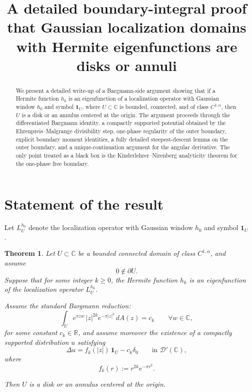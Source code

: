 \documentclass[11pt]{amsart}
\title[Gaussian localization domains for Hermite eigenfunctions]{A detailed boundary-integral proof that Gaussian localization domains with Hermite eigenfunctions are disks or annuli}
\author{}
\date{}
\newtheorem{theorem}{Theorem}
\theoremstyle{remark}
\newcommand{\C}{\mathbb C}
\newcommand{\R}{\mathbb R}
\newcommand{\D}{\mathcal D}
\newcommand{\1}{\mathbf 1}
\begin{document}
\maketitle

\begin{abstract}
We present a detailed write-up of a Bargmann-side argument showing that if a Hermite function $h_k$ is an eigenfunction of a localization operator with Gaussian window $h_0$ and symbol $\mathbf 1_U$, where $U\subset\C$ is bounded, connected, and of class $C^{1,\alpha}$, then $U$ is a disk or an annulus centered at the origin. The argument proceeds through the differentiated Bargmann identity, a compactly supported potential obtained by the Ehrenpreis--Malgrange divisibility step, one-phase regularity of the outer boundary, explicit boundary moment identities, a fully detailed steepest-descent lemma on the outer boundary, and a unique-continuation argument for the angular derivative. The only point treated as a black box is the Kinderlehrer--Nirenberg analyticity theorem for the one-phase free boundary.
\end{abstract}

\section{Statement of the result}

Let $L_U^{h_0}$ denote the localization operator with Gaussian window $h_0$ and symbol $\mathbf 1_U$.

\begin{theorem}\label{thm:main}
Let $U\subset\C$ be a bounded connected domain of class $C^{1,\alpha}$, and assume
\[
0\notin \partial U.
\]
Suppose that for some integer $k\ge 0$, the Hermite function $h_k$ is an eigenfunction of the localization operator $L_U^{h_0}$.

Assume the standard Bargmann reduction:
\begin{equation}\label{eq:exp-identity}
\int_U e^{\pi z w}\, |z|^{2k} e^{-\pi |z|^2}\, dA(z)=c_k
\qquad \forall w\in\C,
\end{equation}
for some constant $c_k\in\R$, and assume moreover the existence of a compactly supported distribution $u$ satisfying
\begin{equation}\label{eq:distribution-u}
\Delta u = f_k(|z|)\,\1_U - c_k\delta_0
\qquad\text{in }\D'(\C),
\end{equation}
where
\[
f_k(r):=r^{2k}e^{-\pi r^2}.
\]

Then $U$ is a disk or an annulus centered at the origin.
\end{theorem}
\end{document}
